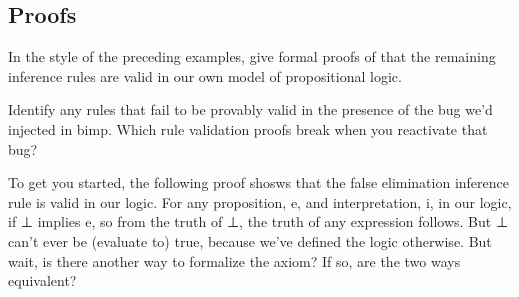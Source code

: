 \documentclass[letterpaper,10pt,english]{sphinxmanual}
\begin{document}
\begin{sphinxVerbatim}[commandchars=\\\{\}]
       
\end{sphinxVerbatim}


\subsection{Proofs}
\label{\detokenize{A_01_Propositional_Logic:proofs}}
\sphinxAtStartPar
In the style of the preceding examples, give formal proofs
of that the remaining inference rules are valid in our own
model of propositional logic.

\sphinxAtStartPar
Identify any rules that fail to be provably valid in the
presence of the bug we’d injected in bimp. Which rule
validation proofs break when you re\sphinxhyphen{}activate that bug?

\sphinxAtStartPar
To get you started, the following proof shosws that the
false elimination inference rule is valid in our logic.
For any proposition, e, and interpretation, i, in
our logic, if ⊥ implies e, so from the truth of
⊥, the truth of any expression follows. But ⊥
can’t ever be (evaluate to) true, because we’ve
defined the logic otherwise. But wait, is there
another way to formalize the axiom? If so, are
the two ways equivalent?

\begin{sphinxVerbatim}[commandchars=\\\{\}]
      
  
 
   




  
           
\end{sphinxVerbatim}

\sphinxstepscope
\end{document}
